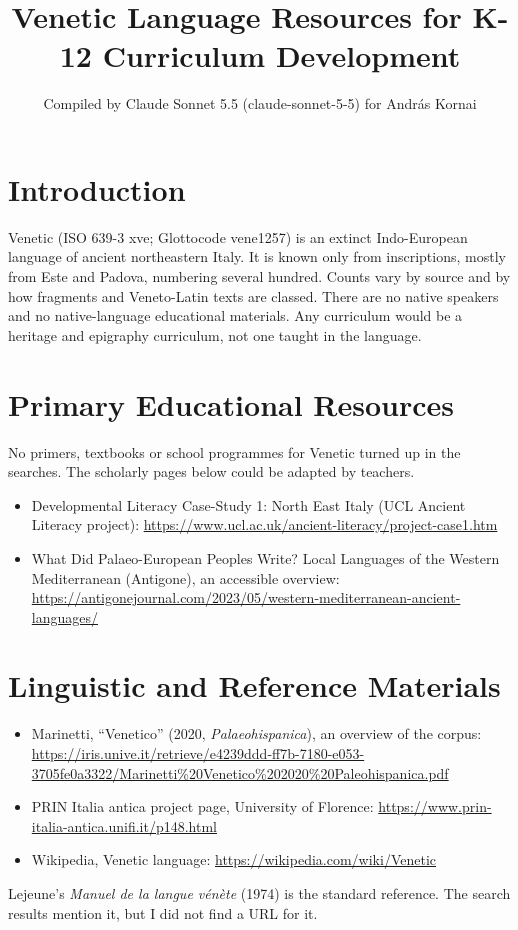 \documentclass[12pt]{article}
\title{Venetic Language Resources for K-12 Curriculum Development}
\author{Compiled by Claude Sonnet 5.5 (claude-sonnet-5-5) for Andr\'as Kornai}
\date{}
\begin{document}
\maketitle

\section{Introduction}
Venetic (ISO 639-3 xve; Glottocode vene1257) is an extinct Indo-European language of ancient northeastern Italy. It is known only from inscriptions, mostly from Este and Padova, numbering several hundred. Counts vary by source and by how fragments and Veneto-Latin texts are classed. There are no native speakers and no native-language educational materials. Any curriculum would be a heritage and epigraphy curriculum, not one taught in the language.

\section{Primary Educational Resources}
No primers, textbooks or school programmes for Venetic turned up in the searches. The scholarly pages below could be adapted by teachers.
\begin{itemize}
\item Developmental Literacy Case-Study 1: North East Italy (UCL Ancient Literacy project): \url{https://www.ucl.ac.uk/ancient-literacy/project-case1.htm}
\item What Did Palaeo-European Peoples Write? Local Languages of the Western Mediterranean (Antigone), an accessible overview: \url{https://antigonejournal.com/2023/05/western-mediterranean-ancient-languages/}
\end{itemize}

\section{Linguistic and Reference Materials}
\begin{itemize}
\item Marinetti, ``Venetico'' (2020, \emph{Palaeohispanica}), an overview of the corpus: \url{https://iris.unive.it/retrieve/e4239ddd-ff7b-7180-e053-3705fe0a3322/Marinetti%20Venetico%202020%20Paleohispanica.pdf}
\item PRIN Italia antica project page, University of Florence: \url{https://www.prin-italia-antica.unifi.it/p148.html}
\item Wikipedia, Venetic language: \url{https://wikipedia.com/wiki/Venetic}
\end{itemize}
Lejeune's \emph{Manuel de la langue v\'en\`ete} (1974) is the standard reference. The search results mention it, but I did not find a URL for it.
\end{document}
